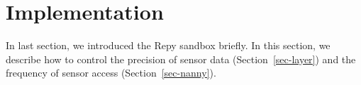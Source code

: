 \section{Implementation}\label{sec-policy}
In last section, we introduced the Repy sandbox briefly. 
In this section, we describe how to control the precision of sensor data (Section~\ref{sec-layer}) 
and the frequency of sensor access (Section~\ref{sec-nanny}).

\begin{comment}
\subsection{Sensor Access from the Repy Sandbox}



\yanyan{this subsection is too detailed. maybe put in a TR, except the
last paragraph.}


To allow a researcher's code to access sensors, such as 
GPS, WiFi, Bluetooth, accelerometer, and cellular network, the Repy  
sandbox needs access to native Android code. \lois{I think I already 
asked this, but does this only run on Android devices? If so, I think 
that needs to be mentioned.} We first implemented a set of sensor 
functions using Java native code. \lois{Again, who implemented the sensors? And are you referring to the design initially done that is now in the oast? Or the actions taken by a user now} The Repy 
sandbox then uses a Remote Procedure Call (RPC) to invoke the
corresponding Java code in Python, and returns the data 
to a sandboxed Repy program. This defines a set of sensor APIs in 
Repy's programming language, such as \path{get_location()}, 
\path{get_accelerometer()}, \path{get_wifi()}, etc. 


\end{comment}
